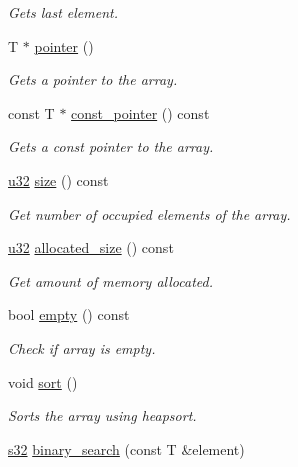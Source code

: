 \begin{DoxyCompactItemize}
\begin{DoxyCompactList}\small\item\em Gets last element. \end{DoxyCompactList}\item 
T $\ast$ \hyperlink{classirr_1_1core_1_1pseudoarray_afe861bbf5267706cf4e08e4da448a4ad}{pointer} ()
\begin{DoxyCompactList}\small\item\em Gets a pointer to the array. \end{DoxyCompactList}\item 
const T $\ast$ \hyperlink{classirr_1_1core_1_1pseudoarray_aafe9d7b336b821a604dd4563ab47225b}{const\+\_\+pointer} () const 
\begin{DoxyCompactList}\small\item\em Gets a const pointer to the array. \end{DoxyCompactList}\item 
\hyperlink{namespaceirr_a0416a53257075833e7002efd0a18e804}{u32} \hyperlink{classirr_1_1core_1_1pseudoarray_ab28729f59bf9e55e413a38f697014a1c}{size} () const 
\begin{DoxyCompactList}\small\item\em Get number of occupied elements of the array. \end{DoxyCompactList}\item 
\hyperlink{namespaceirr_a0416a53257075833e7002efd0a18e804}{u32} \hyperlink{classirr_1_1core_1_1pseudoarray_abeed6fb7c047af0fc07397976c3cedef}{allocated\+\_\+size} () const 
\begin{DoxyCompactList}\small\item\em Get amount of memory allocated. \end{DoxyCompactList}\item 
bool \hyperlink{classirr_1_1core_1_1pseudoarray_aa5ccbee4785125805d83f3b12bc10336}{empty} () const 
\begin{DoxyCompactList}\small\item\em Check if array is empty. \end{DoxyCompactList}\item 
void \hyperlink{classirr_1_1core_1_1pseudoarray_a7e98df807c706fe41de8e3ab3253287e}{sort} ()
\begin{DoxyCompactList}\small\item\em Sorts the array using heapsort. \end{DoxyCompactList}\item 
\hyperlink{namespaceirr_ac66849b7a6ed16e30ebede579f9b47c6}{s32} \hyperlink{classirr_1_1core_1_1pseudoarray_ae027c281626d25f49f7042dde9d4085f}{binary\+\_\+search} (const T \&element)

\end{DoxyCompactItemize}
